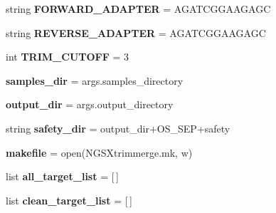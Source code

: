 \begin{DoxyCompactItemize}
\item 
string {\bfseries F\+O\+R\+W\+A\+R\+D\+\_\+\+A\+D\+A\+P\+T\+ER} = \textquotesingle{}A\+G\+A\+T\+C\+G\+G\+A\+A\+G\+A\+GC\textquotesingle{}\hypertarget{namespaceNGSXtrimmerge_afbe5347856b4a02c7008abbecdca1724}{}\label{namespaceNGSXtrimmerge_afbe5347856b4a02c7008abbecdca1724}

\item 
string {\bfseries R\+E\+V\+E\+R\+S\+E\+\_\+\+A\+D\+A\+P\+T\+ER} = \textquotesingle{}A\+G\+A\+T\+C\+G\+G\+A\+A\+G\+A\+GC\textquotesingle{}\hypertarget{namespaceNGSXtrimmerge_a2b7f7dab9d98140a8b6e42f7e6240610}{}\label{namespaceNGSXtrimmerge_a2b7f7dab9d98140a8b6e42f7e6240610}

\item 
int {\bfseries T\+R\+I\+M\+\_\+\+C\+U\+T\+O\+FF} = 3\hypertarget{namespaceNGSXtrimmerge_aef5f878f5b107344fcfc36bebcd136cb}{}\label{namespaceNGSXtrimmerge_aef5f878f5b107344fcfc36bebcd136cb}

\item 
{\bfseries samples\+\_\+dir} = args.\+samples\+\_\+directory\hypertarget{namespaceNGSXtrimmerge_aaa726273347f9c5c8985eebce27a5101}{}\label{namespaceNGSXtrimmerge_aaa726273347f9c5c8985eebce27a5101}

\item 
{\bfseries output\+\_\+dir} = args.\+output\+\_\+directory\hypertarget{namespaceNGSXtrimmerge_a11cdc1db7cb8ca5cda1d889709f17410}{}\label{namespaceNGSXtrimmerge_a11cdc1db7cb8ca5cda1d889709f17410}

\item 
string {\bfseries safety\+\_\+dir} = output\+\_\+dir+O\+S\+\_\+\+S\+EP+\textquotesingle{}safety\textquotesingle{}\hypertarget{namespaceNGSXtrimmerge_ac467777b3b1f82d11642374fcac34713}{}\label{namespaceNGSXtrimmerge_ac467777b3b1f82d11642374fcac34713}

\item 
{\bfseries makefile} = open(\textquotesingle{}N\+G\+S\+Xtrimmerge.\+mk\textquotesingle{}, \textquotesingle{}w\textquotesingle{})\hypertarget{namespaceNGSXtrimmerge_a9743c64a4def7f24bc8575164c974c32}{}\label{namespaceNGSXtrimmerge_a9743c64a4def7f24bc8575164c974c32}

\item 
list {\bfseries all\+\_\+target\+\_\+list} = \mbox{[}$\,$\mbox{]}\hypertarget{namespaceNGSXtrimmerge_aafb9e1bd8cd531f5bf3e4033b02ec75d}{}\label{namespaceNGSXtrimmerge_aafb9e1bd8cd531f5bf3e4033b02ec75d}

\item 
list {\bfseries clean\+\_\+target\+\_\+list} = \mbox{[}$\,$\mbox{]}\hypertarget{namespaceNGSXtrimmerge_a406896a111e13155d5e8533f4c3fe1c0}{}\label{namespaceNGSXtrimmerge_a406896a111e13155d5e8533f4c3fe1c0}


\end{DoxyCompactItemize}
